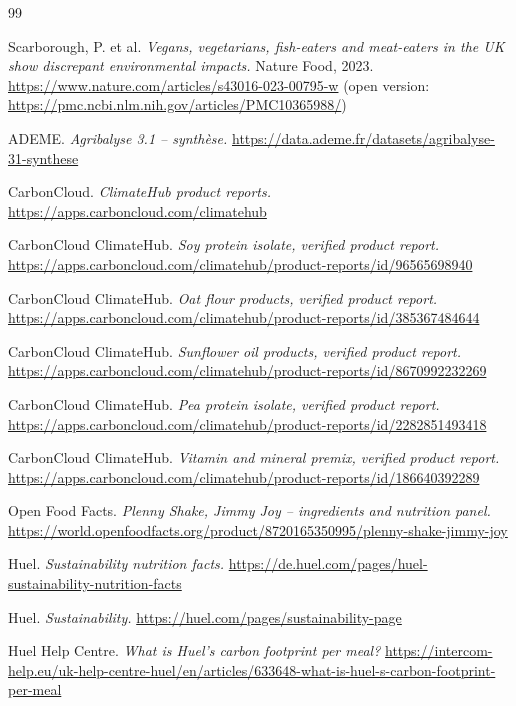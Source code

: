 \documentclass[11pt,a4paper]{article}
\begin{document}
\begin{thebibliography}{99}
\footnotesize

 Scarborough, P. et al. \emph{Vegans, vegetarians, fish-eaters and meat-eaters in the UK show discrepant environmental impacts.} Nature Food, 2023. \url{https://www.nature.com/articles/s43016-023-00795-w} (open version: \url{https://pmc.ncbi.nlm.nih.gov/articles/PMC10365988/})

 ADEME. \emph{Agribalyse 3.1 -- synthèse.} \url{https://data.ademe.fr/datasets/agribalyse-31-synthese}

 CarbonCloud. \emph{ClimateHub product reports.} \url{https://apps.carboncloud.com/climatehub}

 CarbonCloud ClimateHub. \emph{Soy protein isolate, verified product report.} \url{https://apps.carboncloud.com/climatehub/product-reports/id/96565698940}

 CarbonCloud ClimateHub. \emph{Oat flour products, verified product report.} \url{https://apps.carboncloud.com/climatehub/product-reports/id/385367484644}

 CarbonCloud ClimateHub. \emph{Sunflower oil products, verified product report.} \url{https://apps.carboncloud.com/climatehub/product-reports/id/8670992232269}

 CarbonCloud ClimateHub. \emph{Pea protein isolate, verified product report.} \url{https://apps.carboncloud.com/climatehub/product-reports/id/2282851493418}

 CarbonCloud ClimateHub. \emph{Vitamin and mineral premix, verified product report.} \url{https://apps.carboncloud.com/climatehub/product-reports/id/186640392289}

 Open Food Facts. \emph{Plenny Shake, Jimmy Joy -- ingredients and nutrition panel.} \url{https://world.openfoodfacts.org/product/8720165350995/plenny-shake-jimmy-joy}

 Huel. \emph{Sustainability nutrition facts.} \url{https://de.huel.com/pages/huel-sustainability-nutrition-facts}

 Huel. \emph{Sustainability.} \url{https://huel.com/pages/sustainability-page}

 Huel Help Centre. \emph{What is Huel's carbon footprint per meal?} \url{https://intercom-help.eu/uk-help-centre-huel/en/articles/633648-what-is-huel-s-carbon-footprint-per-meal}


\end{thebibliography}
\end{document}
